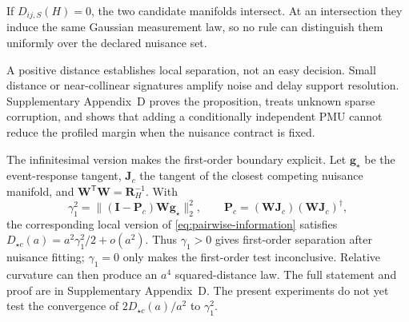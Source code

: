 \begin{proposition}
\label{prop:source-indistinguishability}
If $D_{ij,S}(H)=0$, the two candidate manifolds intersect. At an intersection they induce the same Gaussian measurement law, so no rule can distinguish them uniformly over the declared nuisance set.
\end{proposition}

A positive distance establishes local separation, not an easy decision. Small distance or near-collinear signatures amplify noise and delay support resolution. Supplementary Appendix~D proves the proposition, treats unknown sparse corruption, and shows that adding a conditionally independent PMU cannot reduce the profiled margin when the nuisance contract is fixed.

The infinitesimal version makes the first-order boundary explicit. Let
$\bm g_\star$ be the event-response tangent, $\bm J_c$ the tangent of the closest
competing nuisance manifold, and $\bm W^{\mathsf T}\bm W=\bm R_H^{-1}$. With
\begin{equation}
 \gamma_1^2=\|\left(\bm I-\bm P_c\right)\bm W\bm g_\star\|_2^2,
 \qquad
 \bm P_c=(\bm W\bm J_c)(\bm W\bm J_c)^{\dagger},
 \label{eq:profiled-first-order-coefficient}
\end{equation}
the corresponding local version of \eqref{eq:pairwise-information} satisfies
$D_{\star c}(a)=a^2\gamma_1^2/2+o(a^2)$. Thus $\gamma_1>0$ gives
first-order separation after nuisance fitting; $\gamma_1=0$ only makes the
first-order test inconclusive. Relative curvature can then produce an $a^4$
squared-distance law. The full statement and proof are in Supplementary
Appendix~D. The present experiments do not yet test the convergence of
$2D_{\star c}(a)/a^2$ to $\gamma_1^2$.

